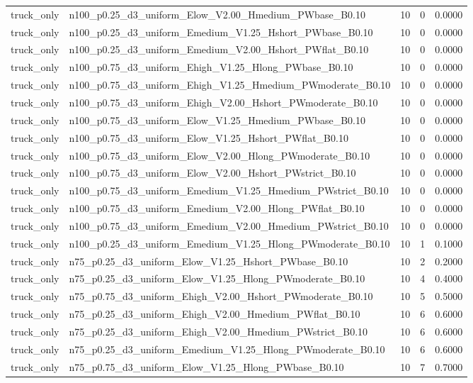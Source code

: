 \begin{tabular}{llrrr}
truck_only & n100_p0.25_d3_uniform_Elow_V2.00_Hmedium_PWbase_B0.10 & 10 & 0 & 0.0000 \\
truck_only & n100_p0.25_d3_uniform_Emedium_V1.25_Hshort_PWbase_B0.10 & 10 & 0 & 0.0000 \\
truck_only & n100_p0.25_d3_uniform_Emedium_V2.00_Hshort_PWflat_B0.10 & 10 & 0 & 0.0000 \\
truck_only & n100_p0.75_d3_uniform_Ehigh_V1.25_Hlong_PWbase_B0.10 & 10 & 0 & 0.0000 \\
truck_only & n100_p0.75_d3_uniform_Ehigh_V1.25_Hmedium_PWmoderate_B0.10 & 10 & 0 & 0.0000 \\
truck_only & n100_p0.75_d3_uniform_Ehigh_V2.00_Hshort_PWmoderate_B0.10 & 10 & 0 & 0.0000 \\
truck_only & n100_p0.75_d3_uniform_Elow_V1.25_Hmedium_PWbase_B0.10 & 10 & 0 & 0.0000 \\
truck_only & n100_p0.75_d3_uniform_Elow_V1.25_Hshort_PWflat_B0.10 & 10 & 0 & 0.0000 \\
truck_only & n100_p0.75_d3_uniform_Elow_V2.00_Hlong_PWmoderate_B0.10 & 10 & 0 & 0.0000 \\
truck_only & n100_p0.75_d3_uniform_Elow_V2.00_Hshort_PWstrict_B0.10 & 10 & 0 & 0.0000 \\
truck_only & n100_p0.75_d3_uniform_Emedium_V1.25_Hmedium_PWstrict_B0.10 & 10 & 0 & 0.0000 \\
truck_only & n100_p0.75_d3_uniform_Emedium_V2.00_Hlong_PWflat_B0.10 & 10 & 0 & 0.0000 \\
truck_only & n100_p0.75_d3_uniform_Emedium_V2.00_Hmedium_PWstrict_B0.10 & 10 & 0 & 0.0000 \\
truck_only & n100_p0.25_d3_uniform_Emedium_V1.25_Hlong_PWmoderate_B0.10 & 10 & 1 & 0.1000 \\
truck_only & n75_p0.25_d3_uniform_Elow_V1.25_Hshort_PWbase_B0.10 & 10 & 2 & 0.2000 \\
truck_only & n75_p0.25_d3_uniform_Elow_V1.25_Hlong_PWmoderate_B0.10 & 10 & 4 & 0.4000 \\
truck_only & n75_p0.75_d3_uniform_Ehigh_V2.00_Hshort_PWmoderate_B0.10 & 10 & 5 & 0.5000 \\
truck_only & n75_p0.25_d3_uniform_Ehigh_V2.00_Hmedium_PWflat_B0.10 & 10 & 6 & 0.6000 \\
truck_only & n75_p0.25_d3_uniform_Ehigh_V2.00_Hmedium_PWstrict_B0.10 & 10 & 6 & 0.6000 \\
truck_only & n75_p0.25_d3_uniform_Emedium_V1.25_Hlong_PWmoderate_B0.10 & 10 & 6 & 0.6000 \\
truck_only & n75_p0.75_d3_uniform_Elow_V1.25_Hlong_PWbase_B0.10 & 10 & 7 & 0.7000 \\

\end{tabular}
